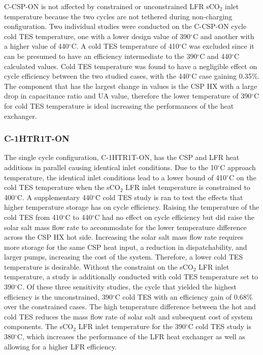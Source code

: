 \begin{paracol}{2}
C-CSP-ON is not affected by constrained or unconstrained LFR sCO$_2$ inlet temperature because the two cycles are not tethered during non-charging configuration. Two individual studies were conducted on the C-CSP-ON cycle cold TES temperature, one with a lower design value of 390$^{\circ}$C and another with a higher value of 440$^{\circ}$C. A cold TES temperature of 410$^{\circ}$C was excluded since it can be presumed to have an efficiency intermediate to the 390$^{\circ}$C and 440$^{\circ}$C calculated values. Cold TES temperature was found to have a negligible effect on cycle efficiency between the two studied cases, with the 440$^{\circ}$C case gaining 0.35\%. The component that has the largest change in values is the CSP HX with a large drop in capacitance ratio and UA value, therefore the lower temperature of 390$^{\circ}$C for cold TES temperature is ideal increasing the performances of the heat exchanger. 


\subsubsection{C-1HTR1T-ON}
The single cycle configuration, C-1HTR1T-ON, has the CSP and LFR heat additions in parallel causing identical inlet conditions. Due to the 10$^{\circ}$C approach temperature, the identical inlet conditions lead to a lower bound of 410$^{\circ}$C on the cold TES temperature when the sCO$_2$ LFR inlet temperature is constrained to 400$^{\circ}$C. A supplementary 440$^{\circ}$C cold TES study is ran to test the effects that higher temperature storage has on cycle efficiency. Raising the temperature of the cold TES from 410$^{\circ}$C to 440$^{\circ}$C had no effect on cycle efficiency but did raise the solar salt mass flow rate to accommodate for the lower temperature difference across the CSP HX hot side. Increasing the solar salt mass flow rate requires more storage for the same CSP heat input, a reduction in dispatchability, and larger pumps, increasing the cost of the system. Therefore, a lower cold TES temperature is desirable. Without the constraint on the sCO$_2$ LFR inlet temperature, a study is additionally conducted with cold TES temperature set to 390$^{\circ}$C. Of these three sensitivity studies, the cycle that yielded the highest efficiency is the unconstrained, 390$^{\circ}$C cold TES with an efficiency gain of 0.68\% over the constrained cases. The high temperature difference between the hot and cold TES reduces the mass flow rate of solar salt and subsequent cost of system components. The sCO$_2$ LFR inlet temperature for the 390$^{\circ}$C cold TES study is 380$^{\circ}$C, which increases the performance of the LFR heat exchanger as well as allowing for a higher LFR efficiency. 


\end{paracol}

